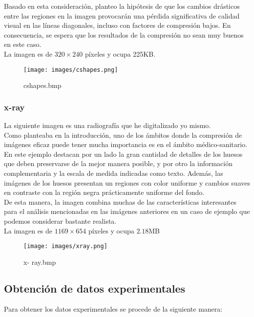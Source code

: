 \documentclass[12pt,a4paper]{article}
\begin{document}
Basado en esta consideración, planteo la hipótesis de que los cambios drásticos entre las regiones en la imagen provocarán una pérdida significativa de calidad visual en las líneas diagonales, incluso con factores de compresión bajos. En consecuencia, se espera que los resultados de la compresión no sean muy buenos en este caso.\\

La imagen es de $320\times240$ píxeles y ocupa 225KB.\\

\begin{figure}[H]
    \centering
    \texttt{[image: images/cshapes.png]}
    \caption{cshapes.bmp}
    
\end{figure}

\break
\subsubsection{x-ray}
La siguiente imagen es una radiografía que he digitalizado yo mismo.\\

Como planteaba en la introducción, uno de los ámbitos donde la compresión de imágenes eficaz puede tener mucha importancia es en el ámbito médico-sanitario.\\

En este ejemplo destacan por un lado la gran cantidad de detalles de los huesos que deben preservarse de la mejor manera posible, y por otro la información complementaria y la escala de medida indicadas como texto. Además, las imágenes de los huesos presentan un regiones con color uniforme y cambios suaves en contraste con la región negra prácticamente uniforme del fondo.\\

De esta manera, la imagen combina muchas de las características interesantes para el análisis mencionadas en las imágenes anteriores en un caso de ejemplo que podemos considerar bastante realista.\\

La imagen es de $1169\times654$ píxeles y ocupa $2.18$MB

\begin{figure}[H]
    \centering
    \texttt{[image: images/xray.png]}
    \caption{x- ray.bmp}
\end{figure}

\break
\subsection{Obtención de datos experimentales}
Para obtener los datos experimentales se procede de la siguiente manera:\\
\end{document}
